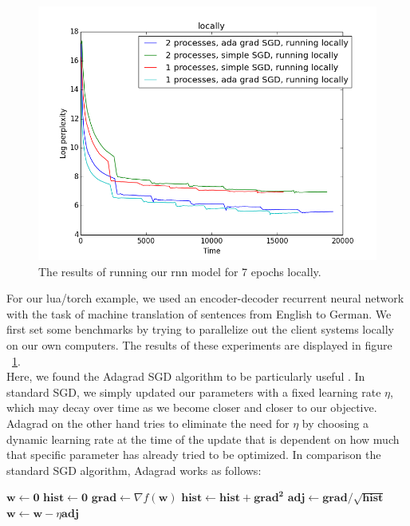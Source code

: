 \documentclass[11pt]{article}
\begin{document}
\begin{figure}[!htb]
  \centering
      \includegraphics[scale = .5]{./images/locally}
  \caption{The results of running our rnn model for 7 epochs locally.}
  \label{fig:local}
\end{figure}

\noindent For our lua/torch example, we used an encoder-decoder recurrent neural network with the task of machine translation of sentences from English to German. We first set some benchmarks by trying to parallelize out the client systems locally on our own computers. The results of these experiments are displayed in figure ~\ref{fig:local}.\\

\noindent Here, we found the Adagrad SGD algorithm to be particularly useful \cite{adagrad}. In standard SGD, we simply updated our parameters with a fixed learning rate $\eta$, which may decay over time as we become closer and closer to our objective. Adagrad on the other hand tries to eliminate the need for $\eta$ by choosing a dynamic learning rate at the time of the update that is dependent on how much that specific parameter has already tried to be optimized. In comparison the standard SGD algorithm, Adagrad works as follows:\\
\begin{algorithmic}
\State $\mathbf w \gets \mathbf 0$
\State $\mathbf{hist} \gets \mathbf 0$
	\State $\mathbf{grad} \gets \nabla f(\mathbf w)$
	\State $\mathbf{hist} \gets \mathbf{hist + grad^2}$
	\State $\mathbf{adj} \gets \mathbf{grad} / \sqrt{\mathbf{hist}}$
    \State $\mathbf w \gets \mathbf w - \eta \mathbf{adj}$
	\EndFor
\EndWhile
\end{algorithmic}
\end{document}
